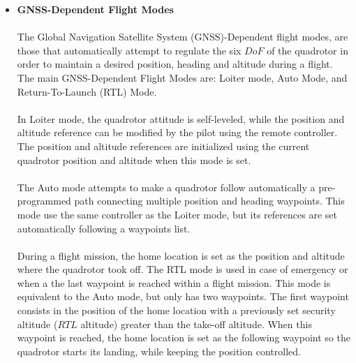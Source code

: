 \begin{itemize}
\item \textbf{GNSS-Dependent Flight Modes}\\\\
The Global Navigation Satellite System (GNSS)-Dependent flight modes, are those that automatically attempt to regulate the six $DoF$ of the quadrotor in order to maintain a desired position, heading and altitude during a flight. The main GNSS-Dependent Flight Modes are: Loiter mode, Auto Mode, and Return-To-Launch (RTL) Mode.
\\\\
In Loiter mode, the quadrotor attitude is self-leveled, while the position and altitude reference can be modified by the pilot using the remote controller. The position and altitude references are initialized using the current quadrotor position and altitude when this mode is set. 
\\\\
The Auto mode attempts to make a quadrotor follow automatically a pre-programmed path connecting multiple position and heading waypoints. This mode use the same controller as the Loiter mode, but its references are set automatically following a waypoints list. 
\\\\
During a flight mission, the home location is set as the position and altitude where the quadrotor took off. The RTL mode is used in case of emergency or when a the last waypoint is reached within a flight mission. This mode is equivalent to the Auto mode, but only has two waypoints. The first waypoint consists in the position of the home location with a previously set security altitude ($RTL$ altitude) greater than the take-off altitude. When this waypoint is reached, the home location is set as the following waypoint so the quadrotor starts its landing, while keeping the position controlled.
\end{itemize}



